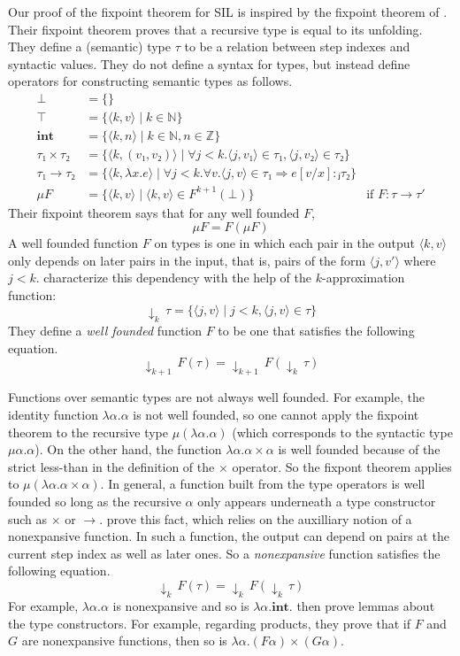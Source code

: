 \documentclass[acmsmall]{acmart}
\newcommand{\kapprox}[2]{↓_{#1}\, #2}
\begin{document}
Our proof of the fixpoint theorem for SIL is inspired by the fixpoint
theorem of \citet{Appel:2001aa}. Their fixpoint theorem proves that a
recursive type is equal to its unfolding.  They define a (semantic)
type $\tau$ to be a relation between step indexes and syntactic
values. They do not define a syntax for types, but instead define
operators for constructing semantic types as follows.
\begin{align*}
  ⊥ &= \{ \} \\
  ⊤ &= \{ ⟨k,v⟩ \mid k ∈ ℕ\} \\
  \mathbf{int} &= \{⟨k,n⟩ \mid k ∈ ℕ, n ∈ ℤ \}\\
  τ₁ × τ₂ &= \{ ⟨k,(v₁,v₂)⟩ \mid ∀j<k. ⟨j,v₁⟩∈τ₁, ⟨j,v₂⟩∈τ₂ \} \\
  τ₁ → τ₂ &= \{ ⟨k,λx.e⟩ \mid ∀j<k.∀v. ⟨j,v⟩∈τ₁ ⇒ e[v/x] :ⱼ τ₂ \} \\
  μ F &= \{ ⟨k,v⟩ \mid ⟨k,v⟩ ∈ F^{k\plus 1}(⊥) \}
    & \text{if } F : \tau \to \tau'
\end{align*}
Their fixpoint theorem says that for any well founded $F$,
\[
  μ F = F(μF)
\]
A well founded function $F$ on types is
one in which each pair in the output $⟨k,v⟩$ only depends
on later pairs in the input, that is, pairs of the form $⟨j,v′⟩$
where $j < k$. \citet{Appel:2001aa} characterize this dependency
with the help of the $k$-approximation function:
\[
  \kapprox{k}{τ} = \{ ⟨j,v⟩ \mid j < k, ⟨j,v⟩ ∈ τ\} 
\]
They define a \emph{well founded} function $F$ to be one that
satisfies the following equation.
\[
  \kapprox{k \plus 1}{F(τ)} = \kapprox{k \plus 1}{F(\kapprox{k}{τ})}
\]

Functions over semantic types are not always well founded.  For
example, the identity function $λα.α$ is not well founded, so one
cannot apply the fixpoint theorem to the recursive type $μ(λα.α)$
(which corresponds to the syntactic type $μα.α$).
On the other hand, the function
$λα.α×α$ is well founded because of the strict less-than in the
definition of the $×$ operator. So the fixpont theorem applies to
$μ(λα.α×α)$.  In general, a function built from the type operators is
well founded so long as the recursive $α$ only appears underneath a
type constructor such as $×$ or $→$. \citet{Appel:2001aa} prove this
fact, which relies on the auxilliary notion of a nonexpansive
function. In such a function, the output can depend on pairs at the
current step index as well as later ones. So a \emph{nonexpansive}
function satisfies the following equation.
\[
  \kapprox{k}{F(τ)} = \kapprox{k}{F(\kapprox{k}{τ})}
\]
For example, $λα.α$ is nonexpansive and so is $λα.\mathbf{int}$.
\citet{Appel:2001aa} then prove lemmas about the type constructors.
For example, regarding products, they prove that if $F$ and $G$
are nonexpansive functions, then so is $λ α. (F α) × (G α)$.
\end{document}
